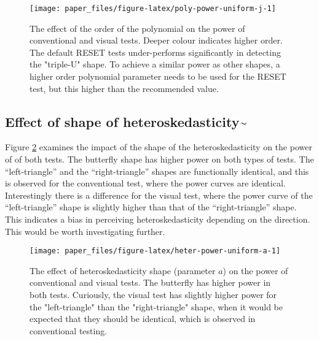 \documentclass[]{interact}
\theoremstyle{plain}%
\theoremstyle{definition}
\theoremstyle{remark}
\begin{document}
\begin{figure}

{\centering \texttt{[image: paper\_files/figure-latex/poly-power-uniform-j-1]} 

}

\caption{The effect of the order of the polynomial on the power of conventional and visual tests. Deeper colour indicates higher order. The default RESET tests under-performs significantly in detecting the "triple-U" shape. To achieve a similar power as other shapes, a higher order polynomial parameter needs to be used for the RESET test, but this higher than the recommended value.}\label{fig:poly-power-uniform-j}
\end{figure}

\hypertarget{effect-of-shape-of-heteroskedasticity}{%
\subsection{\texorpdfstring{Effect of shape of
heteroskedasticity\textasciitilde{}\label{hetero-analysis}}{Effect of shape of heteroskedasticity\textasciitilde{}}}\label{effect-of-shape-of-heteroskedasticity}}

Figure \ref{fig:heter-power-uniform-a} examines the impact of the shape
of the heteroskedasticity on the power of of both tests. The butterfly
shape has higher power on both types of tests. The ``left-triangle'' and
the ``right-triangle'' shapes are functionally identical, and this is
observed for the conventional test, where the power curves are
identical. Interestingly there is a difference for the visual test,
where the power curve of the ``left-triangle'' shape is slightly higher
than that of the ``right-triangle'' shape. This indicates a bias in
perceiving heteroskedasticity depending on the direction. This would be
worth investigating further.

\begin{figure}

{\centering \texttt{[image: paper\_files/figure-latex/heter-power-uniform-a-1]} 

}

\caption{The effect of heteroskedasticity shape (parameter $a$) on the power of conventional and visual tests. The butterfly has higher power in both tests. Curiously, the visual test has slightly higher power for the "left-triangle" than the "right-triangle" shape, when it would be expected that they should be identical, which is observed in conventional testing.}\label{fig:heter-power-uniform-a}
\end{figure}
\end{document}
